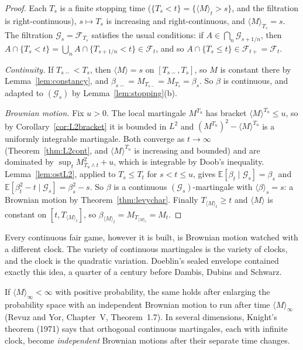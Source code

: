 \begin{proof}
Each $T_s$ is a finite stopping time ($\{T_s<t\}=\{\langle M\rangle_t>s\}$, and the filtration is right-continuous), $s\mapsto T_s$ is increasing and right-continuous, and $\langle M\rangle_{T_s}=s$. The filtration
$\mathcal G_s=\mathcal F_{T_s}$ satisfies the usual conditions: if $A\in\bigcap_n\mathcal G_{s+1/n}$, then $A\cap\{T_s<t\}=\bigcup_nA\cap\{T_{s+1/n}<t\}\in\mathcal F_t$, and so $A\cap\{T_s\le t\}\in\mathcal F_{t+}=\mathcal F_t$.

\emph{Continuity.} If $T_{s-}<T_s$, then $\langle M\rangle=s$ on $[T_{s-},T_s]$, so $M$ is constant there by Lemma~\ref{lem:constancy}, and $\beta_{s-}=M_{T_{s-}}=M_{T_s}=\beta_s$. So $\beta$ is continuous, and adapted to $(\mathcal G_s)$
by Lemma~\ref{lem:stopping}(b).

\emph{Brownian motion.} Fix $u>0$. The local martingale $M^{T_u}$ has bracket $\langle M\rangle^{T_u}\le u$, so by Corollary~\ref{cor:L2bracket} it is bounded in $L^2$ and $(M^{T_u})^2-\langle M\rangle^{T_u}$ is a uniformly integrable
martingale. Both converge as $t\to\infty$ (Theorem~\ref{thm:L2cont}, and $\langle M\rangle^{T_u}$ is increasing and bounded) and are dominated by $\sup_tM_{T_u\wedge t}^2+u$, which is integrable by Doob's inequality. Lemma~\ref{lem:ostL2}, applied to $T_s\le T_t$ for $s<t\le u$, gives
$\mathbb E[\beta_t\mid\mathcal G_s]=\beta_s$ and $\mathbb E[\beta_t^2-t\mid\mathcal G_s]=\beta_s^2-s$. So $\beta$ is a continuous $(\mathcal G_s)$-martingale with $\langle\beta\rangle_s=s$: a Brownian motion by Theorem~\ref{thm:levychar}.
Finally $T_{\langle M\rangle_t}\ge t$ and $\langle M\rangle$ is constant on $[t,T_{\langle M\rangle_t}]$, so $\beta_{\langle M\rangle_t}=M_{T_{\langle M\rangle_t}}=M_t$.
\end{proof}

\begin{beauty}
Every continuous fair game, however it is built, is Brownian motion watched with a different clock. The variety of continuous martingales is the variety of clocks, and the clock is the quadratic
variation. Doeblin's sealed envelope contained exactly this idea, a quarter of a century before Dambis, Dubins and Schwarz.
\end{beauty}

\begin{remark}
If $\langle M\rangle_\infty<\infty$ with positive probability, the same holds after enlarging the probability space with an independent Brownian motion to run after time $\langle M\rangle_\infty$ (Revuz and Yor, Chapter~V,
Theorem~1.7). In several dimensions, Knight's theorem (1971) says that orthogonal continuous martingales, each with infinite clock, become \emph{independent} Brownian motions after their separate time changes.
\end{remark}

